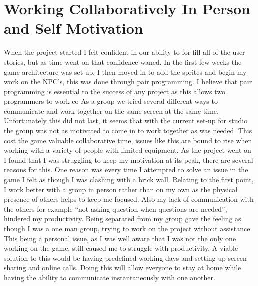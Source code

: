 \documentclass{scrartcl}
\begin{document}
\section{Working Collaboratively In Person and Self Motivation}
When the project started I felt confident in our ability to for fill all of the user stories, but as time went on that confidence waned. In the first few weeks the game architecture was set-up, I then moved in to add the sprites and begin my work on the NPC's, this was done through pair programming. I believe that pair programming is essential to the success of any project as this allows two programmers to work co As a group we tried several different ways to communicate and work together on the same screen at the same time\cite{Radermacher:2011:IEI:1953163.1953346}. Unfortunately this did not last, it seems that with the current set-up for studio the group was not as motivated to come in to work together as was needed. This cost the game valuable collaborative time, issues like this are bound to rise when working with a variety of people with limited equipment. 
\newline
As the project went on I found that I was struggling to keep my motivation at its peak, there are several reasons for this. One reason was every time I attempted to solve an issue in the game I felt as though I was clashing with a brick wall. Relating to the first point, I work better with a group in person rather than on my own as the physical presence of others helps to keep me focused. Also my lack of communication with the others for example ``not asking question when questions are needed'', hindered my productivity. Being separated from my group gave the feeling as though I was a one man group, trying to work on the project without assistance. This being a personal issue, as I was well aware that I was not the only one working on the game, still caused me to struggle with productivity. A viable solution to this would be having predefined working days and setting up screen sharing and online calls. Doing this will allow everyone to stay at home while having the ability to communicate instantaneously with one another. 
\end{document}
